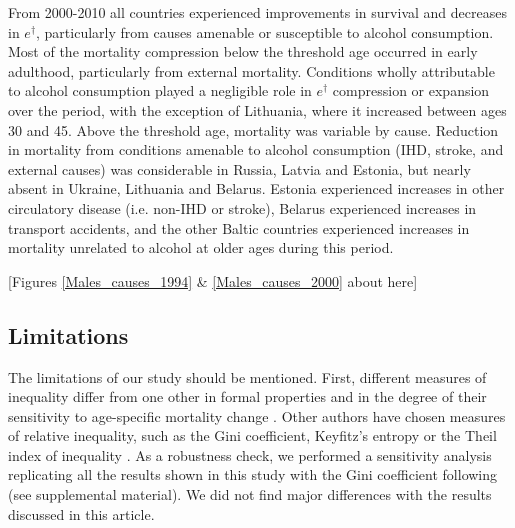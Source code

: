 \documentclass{article}
\begin{document}
\begin{spacing}{1.5}
From 2000-2010 all countries experienced improvements in survival and decreases in $e^\dagger$, particularly from causes amenable or susceptible to alcohol consumption. Most of the mortality compression below the threshold age occurred in early adulthood, particularly from external mortality. Conditions wholly attributable to alcohol consumption played a negligible role in $e^\dagger$ compression or expansion over the period, with the exception of Lithuania, where it increased between ages 30 and 45. Above the threshold age, mortality was variable by cause. Reduction in mortality from conditions amenable to alcohol consumption (IHD, stroke, and external causes) was considerable in Russia, Latvia and Estonia, but nearly absent in Ukraine, Lithuania and Belarus. Estonia experienced increases in other circulatory disease (i.e. non-IHD or stroke), Belarus experienced increases in transport accidents, and the other Baltic countries experienced increases in mortality unrelated to alcohol at older ages during this period.


\begin{center}
[Figures \ref{Males_causes_1994} \& \ref{Males_causes_2000} about here]\\
\end{center}


\subsection*{Limitations} 
The limitations of our study should be mentioned. First, different measures of inequality differ from one other in formal properties and in the degree of their sensitivity to age-specific mortality change \citep{vanraalte2013}. Other authors have chosen measures of relative inequality, such as the Gini coefficient, Keyfitz's entropy or the Theil index of inequality \citep{shkolnikov2003,moser2005world,smits2009,colchero2016emergence}. As a robustness check, we performed a sensitivity analysis replicating all the results shown in this study with the Gini coefficient following \citet{shkolnikov2003} (see supplemental material). We did not find major differences with the results discussed in this article. \\


\end{spacing}
\end{document}
